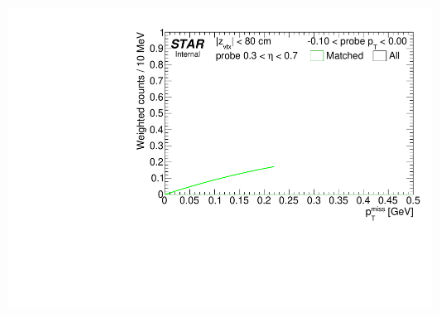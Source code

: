 \begin{figure}[ht]
{  \includegraphics[width=\linewidth,page=11]{graphics/correctionsToEff/TOF_tagAndProbe/Fitting_effVsPt_mc_ETABINS_A.CPT2.pdf}

}
\end{figure}

